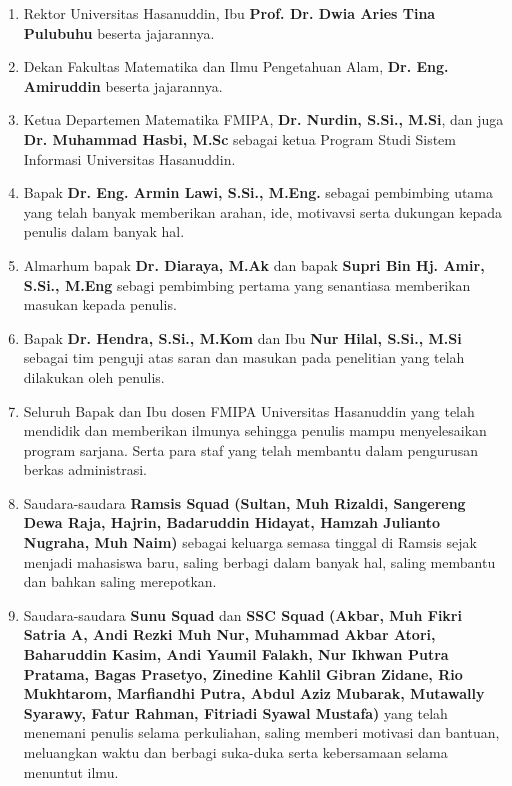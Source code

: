 \begin{enumerate}[topsep=0pt,itemsep=0pt,partopsep=0pt, parsep=0pt]
    \item Rektor Universitas Hasanuddin, Ibu \textbf{Prof. Dr. Dwia Aries Tina Pulubuhu} beserta jajarannya.
    \item Dekan Fakultas Matematika dan Ilmu Pengetahuan Alam, \textbf{Dr. Eng. Amiruddin} beserta jajarannya.
    \item Ketua Departemen Matematika FMIPA, \textbf{Dr. Nurdin, S.Si., M.Si}, dan juga \textbf{Dr. Muhammad Hasbi, M.Sc} sebagai ketua Program Studi Sistem Informasi Universitas Hasanuddin.
    \item Bapak \textbf{Dr. Eng. Armin Lawi, S.Si., M.Eng.} sebagai pembimbing utama yang telah banyak memberikan arahan, ide, motivavsi serta dukungan kepada penulis dalam banyak hal.
    \item Almarhum bapak \textbf{Dr. Diaraya, M.Ak} dan bapak \textbf{Supri Bin Hj. Amir, S.Si., M.Eng} sebagi pembimbing pertama yang senantiasa  memberikan masukan kepada penulis.
    \item Bapak \textbf{Dr. Hendra, S.Si., M.Kom} dan Ibu \textbf{Nur Hilal, S.Si., M.Si} sebagai tim penguji atas saran dan masukan pada penelitian yang telah dilakukan oleh penulis.
    \item Seluruh Bapak dan Ibu dosen FMIPA Universitas Hasanuddin yang telah mendidik dan memberikan ilmunya sehingga penulis mampu menyelesaikan program sarjana. Serta para staf yang telah membantu dalam pengurusan berkas administrasi.

    \item Saudara-saudara \textbf{Ramsis Squad} \textbf{(Sultan, Muh Rizaldi, Sangereng Dewa Raja, Hajrin, Badaruddin Hidayat, Hamzah Julianto Nugraha, Muh Naim)} sebagai keluarga semasa tinggal di Ramsis sejak menjadi mahasiswa baru, saling berbagi dalam banyak hal, saling membantu dan bahkan saling merepotkan.

    \item Saudara-saudara \textbf{Sunu Squad} dan \textbf{SSC Squad} \textbf{(Akbar, Muh Fikri Satria A, Andi Rezki Muh Nur, Muhammad Akbar Atori, Baharuddin Kasim, Andi Yaumil Falakh, Nur Ikhwan Putra Pratama, Bagas Prasetyo, Zinedine Kahlil Gibran Zidane, Rio Mukhtarom, Marfiandhi Putra, Abdul Aziz Mubarak,  Mutawally Syarawy, Fatur Rahman, Fitriadi Syawal Mustafa)} yang telah menemani penulis selama perkuliahan, saling memberi motivasi dan bantuan, meluangkan waktu dan berbagi suka-duka serta kebersamaan selama menuntut ilmu.


\end{enumerate}
